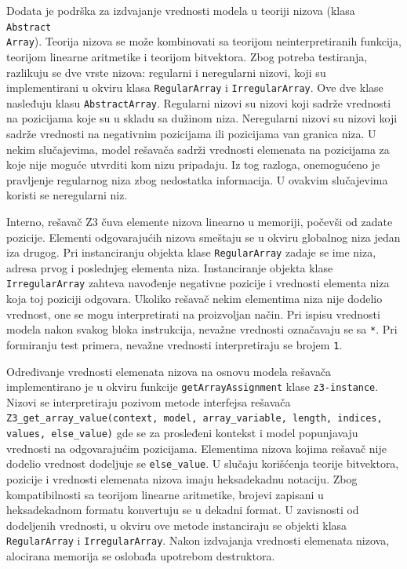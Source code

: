 \documentclass[12pt,oneside]{memoir}
\begin{document}
Dodata je podrška za izdvajanje vrednosti modela u teoriji nizova (klasa \texttt{Abstract\\Array}). Teorija nizova se može kombinovati sa teorijom neinterpretiranih funkcija, teorijom linearne aritmetike i teorijom bitvektora.
Zbog potreba testiranja, razlikuju se dve vrste nizova: regularni i neregularni nizovi, koji su implementirani u okviru klasa \texttt{RegularArray} i \texttt{IrregularArray}. Ove dve klase nasleđuju klasu \texttt{AbstractArray}. Regularni nizovi su nizovi koji sadrže vrednosti na pozicijama koje su u skladu sa dužinom niza. Neregularni nizovi su nizovi koji sadrže vrednosti na negativnim pozicijama ili pozicijama van granica niza. U nekim slučajevima, model rešavača sadrži vrednosti elemenata na pozicijama za koje nije moguće utvrditi kom nizu pripadaju. Iz tog razloga, onemogućeno je pravljenje regularnog niza zbog nedostatka informacija. U ovakvim slučajevima koristi se neregularni niz.
\par
Interno, rešavač Z3 čuva elemente nizova linearno u memoriji, počevši od zadate pozicije. Elementi odgovarajućih nizova smeštaju se u okviru globalnog niza jedan iza drugog. Pri instanciranju objekta klase \texttt{RegularArray} zadaje se ime niza, adresa prvog i poslednjeg elementa niza. Instanciranje objekta klase \texttt{IrregularArray} zahteva navođenje negativne pozicije i vrednosti elementa niza koja toj poziciji odgovara. Ukoliko rešavač nekim elementima niza nije dodelio vrednost, one se mogu interpretirati na proizvoljan način. Pri ispisu vrednosti modela nakon svakog bloka instrukcija, nevažne vrednosti označavaju se sa \texttt{*}. Pri formiranju test primera, nevažne vrednosti interpretiraju se brojem \texttt{1}.
\par
Određivanje vrednosti elemenata nizova na osnovu modela rešavača implementirano je u okviru funkcije \texttt{getArrayAssignment} klase \texttt{z3-instance}. Nizovi se interpretiraju pozivom metode interfejsa rešavača \texttt{Z3\_get\_array\_value(context, model, array\_variable, length, indices, values, else\_value)} gde se za prosleđeni kontekst i model popunjavaju vrednosti na odgovarajućim pozicijama. Elementima nizova kojima rešavač nije dodelio vrednost dodeljuje se \texttt{else\_value}. U slučaju korišćenja teorije bitvektora, pozicije i vrednosti elemenata nizova imaju heksadekadnu notaciju. Zbog kompatibilnosti sa teorijom linearne aritmetike, brojevi zapisani u heksadekadnom formatu konvertuju se u dekadni format. U zavisnosti od dodeljenih vrednosti, u okviru ove metode instanciraju se objekti klasa \texttt{RegularArray} i \texttt{IrregularArray}. Nakon izdvajanja vrednosti elemenata nizova, alocirana memorija se oslobađa upotrebom destruktora.
\end{document}
